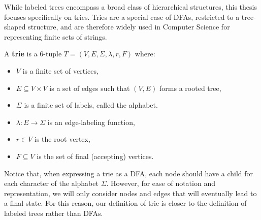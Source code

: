 While labeled trees encompass a broad class of hierarchical structures, this thesis focuses specifically on tries.
Tries are a special case of DFAs, restricted to a tree-shaped structure, and are therefore widely used in Computer Science for representing finite sets of strings.
\begin{definition}[Trie] \label{def:trie}
    A \textbf{trie} is a 6-tuple $T = (V, E, \Sigma, \lambda, r, F)$ where:
    \begin{itemize}
        \item $V$ is a finite set of vertices,
        \item $E \subseteq V \times V$ is a set of edges such that $(V,E)$ forms a rooted tree,
        \item $\Sigma$ is a finite set of labels, called the alphabet.
        \item $\lambda: E \to \Sigma$ is an edge-labeling function,
        \item $r \in V$ is the root vertex,
        \item $F \subseteq V$ is the set of final (accepting) vertices.
    \end{itemize}
\end{definition}
Notice that, when expressing a trie as a DFA, each node should have a child for each character of the alphabet $\Sigma$.
However, for ease of notation and representation, we will only consider nodes and edges that will eventually lead to a final state.
For this reason, our definition of trie is closer to the definition of labeled trees rather than DFAs.

